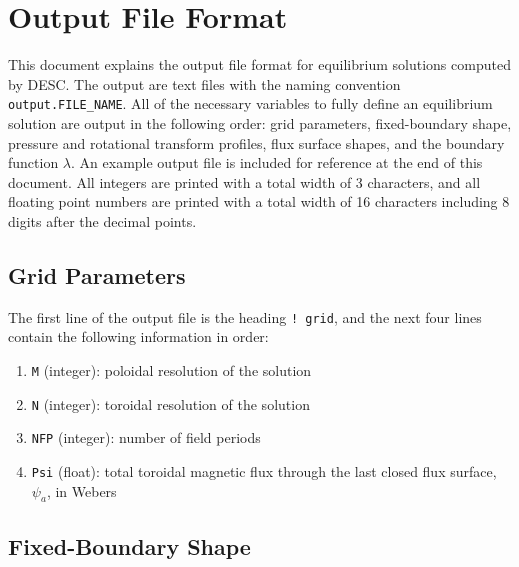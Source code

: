 \documentclass[10pt,a4paper]{article}
\begin{document}
\section*{Output File Format}

This document explains the output file format for equilibrium solutions computed by DESC.  
The output are text files with the naming convention \verb|output.FILE_NAME|.  
All of the necessary variables to fully define an equilibrium solution are output in the following order: 
grid parameters, fixed-boundary shape, pressure and rotational transform profiles, flux surface shapes, and the boundary function $\lambda$.  
An example output file is included for reference at the end of this document.  
All integers are printed with a total width of 3 characters, and all floating point numbers are printed with a total width of 16 characters including 8 digits after the decimal points.  

\subsection*{Grid Parameters}

The first line of the output file is the heading \verb|! grid|, and the next four lines contain the following information in order: 
\begin{enumerate}
\item \verb|M| (integer): poloidal resolution of the solution
\item \verb|N| (integer): toroidal resolution of the solution
\item \verb|NFP| (integer): number of field periods
\item \verb|Psi| (float): total toroidal magnetic flux through the last closed flux surface, $\psi_a$, in Webers
\end{enumerate}

\subsection*{Fixed-Boundary Shape}
\end{document}
